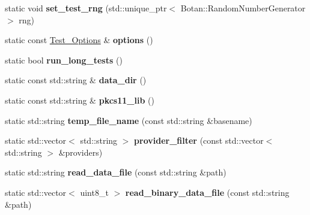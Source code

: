 \begin{DoxyCompactItemize}
\item 
\mbox{\label{class_botan___tests_1_1_test_aaba8172dabf4c3975c39f4143476c72c}} 
static void {\bfseries set\+\_\+test\+\_\+rng} (std\+::unique\+\_\+ptr$<$ Botan\+::\+Random\+Number\+Generator $>$ rng)
\item 
\mbox{\label{class_botan___tests_1_1_test_ac46070d944004dc97334b7583e27a14b}} 
static const \mbox{\hyperlink{class_botan___tests_1_1_test___options}{Test\+\_\+\+Options}} \& {\bfseries options} ()
\item 
\mbox{\label{class_botan___tests_1_1_test_ae6e0b71945912f2e8192808f06e3954d}} 
static bool {\bfseries run\+\_\+long\+\_\+tests} ()
\item 
\mbox{\label{class_botan___tests_1_1_test_a69bce87642f6645418c2f9b258453314}} 
static const std\+::string \& {\bfseries data\+\_\+dir} ()
\item 
\mbox{\label{class_botan___tests_1_1_test_a4838ffc1e859681e048b0a554e7bf8e3}} 
static const std\+::string \& {\bfseries pkcs11\+\_\+lib} ()
\item 
\mbox{\label{class_botan___tests_1_1_test_a89d54680d8ec7531306a88bc214179ac}} 
static std\+::string {\bfseries temp\+\_\+file\+\_\+name} (const std\+::string \&basename)
\item 
\mbox{\label{class_botan___tests_1_1_test_a41eb03eac871da2189a69558ac334297}} 
static std\+::vector$<$ std\+::string $>$ {\bfseries provider\+\_\+filter} (const std\+::vector$<$ std\+::string $>$ \&providers)
\item 
\mbox{\label{class_botan___tests_1_1_test_a595a2106565df712b1168304cb7d69b4}} 
static std\+::string {\bfseries read\+\_\+data\+\_\+file} (const std\+::string \&path)
\item 
\mbox{\label{class_botan___tests_1_1_test_a3a73296296500144b3af1073955e345c}} 
static std\+::vector$<$ uint8\+\_\+t $>$ {\bfseries read\+\_\+binary\+\_\+data\+\_\+file} (const std\+::string \&path)

\end{DoxyCompactItemize}
